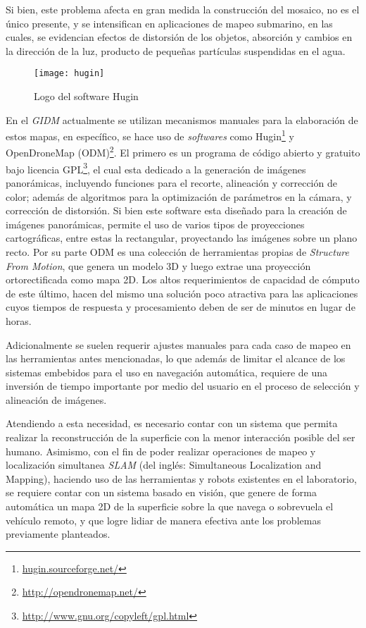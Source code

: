 Si bien, este problema afecta en gran medida la construcción del mosaico, no es el único presente, y se intensifican en aplicaciones de mapeo submarino, en las cuales, se evidencian efectos de distorsión de los objetos, absorción y cambios en la dirección de la luz, producto de pequeñas partículas suspendidas en el agua.

\begin{wrapfigure}{r}{0.3\textwidth}
	\begin{center}
		\vspace*{-0.5in}
		\texttt{[image: hugin]}
	\end{center}
	\caption{Logo del software Hugin}
\end{wrapfigure}

En el \textit{GIDM} actualmente se utilizan mecanismos manuales para la elaboración de estos mapas, en específico, se hace uso de \textit{softwares} como Hugin\footnote{\url{hugin.sourceforge.net/}} y OpenDroneMap (ODM)\footnote{\url{http://opendronemap.net/}}. El primero es un programa de código abierto y gratuito bajo licencia GPL\footnote{\url{http://www.gnu.org/copyleft/gpl.html}}, el cual esta dedicado a la generación de imágenes panorámicas, incluyendo funciones para el recorte, alineación y corrección de color; además de algoritmos para la optimización de parámetros en la cámara, y corrección de distorsión. Si bien este software esta diseñado para la creación de imágenes panorámicas, permite el uso de varios tipos de proyecciones cartográficas, entre estas la rectangular, proyectando las imágenes sobre un plano recto. Por su parte ODM es una colección de herramientas propias de \textit{Structure From Motion}, que genera un modelo 3D y luego extrae una proyección ortorectificada como mapa 2D. Los altos requerimientos de capacidad de cómputo de este último, hacen del mismo una solución poco atractiva para las aplicaciones cuyos tiempos de respuesta y procesamiento deben de ser de minutos en lugar de horas.

Adicionalmente se suelen requerir ajustes manuales para cada caso de mapeo en las herramientas antes mencionadas, lo que además de limitar el alcance de los sistemas embebidos para el uso en navegación automática, requiere de una inversión de tiempo importante por medio del usuario en el proceso de selección y alineación de imágenes.

Atendiendo a esta necesidad, es necesario contar con un sistema que permita realizar la reconstrucción de la superficie con la menor interacción posible del ser humano. Asimismo, con el fin de poder realizar operaciones de mapeo y localización simultanea \textit{SLAM} (del inglés: Simultaneous Localization and Mapping), haciendo uso de las herramientas y robots existentes en el laboratorio, se requiere contar con un sistema basado en visión, que genere de forma automática un mapa 2D de la superficie sobre la que navega o sobrevuela el vehículo remoto, y que logre lidiar de manera efectiva ante los problemas previamente planteados.


